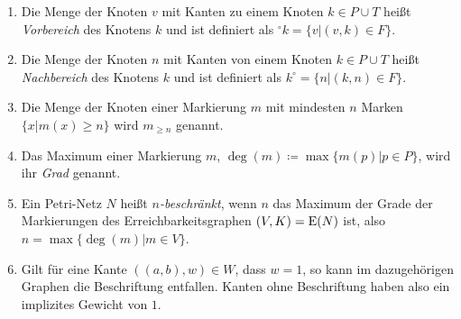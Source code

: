 \begin{enumerate}
	\item Die Menge der Knoten $v$ mit Kanten zu einem Knoten $k \in P\cup T$ heißt \emph{Vorbereich} des Knotens $k$ und ist definiert als $^\circ k = \{v | (v,k) \in F\}$.
	\item Die Menge der Knoten $n$ mit Kanten von einem Knoten $k \in P\cup T$ heißt \emph{Nachbereich} des Knotens $k$ und ist definiert als $k^\circ  = \{n | (k,n) \in F\}$.
	\item Die Menge der Knoten einer Markierung $m$ mit mindesten $n$ Marken $\{x | m(x)\geq n\}$ wird $m_{\geq n}$ genannt.
	\item Das Maximum einer Markierung $m$, $\deg(m) \coloneqq \max \{m(p)|p\in P\}$, wird ihr \emph{Grad} genannt.
	\item Ein Petri-Netz $N$ heißt \emph{$n$-beschränkt}, wenn $n$ das Maximum der Grade der Markierungen des Erreichbarkeitsgraphen $(V,K)=\operatorname{E}(N)$ ist, also $n = \max\{\deg(m)| m\in V \}$.
	\item Gilt für eine Kante $((a, b),w) \in W$, dass $w = 1$, so kann im dazugehörigen Graphen die Beschriftung entfallen. Kanten ohne Beschriftung haben also ein implizites Gewicht von $1$.
\end{enumerate}



